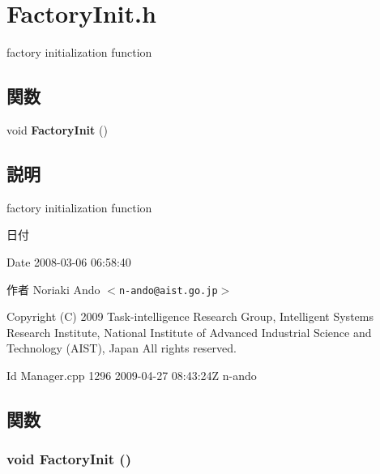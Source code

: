 \section{FactoryInit.h}
\label{FactoryInit_8h}


factory initialization function  


\subsection*{関数}
\begin{DoxyCompactItemize}
\item 
void {\bf FactoryInit} ()
\end{DoxyCompactItemize}


\subsection{説明}
factory initialization function \begin{DoxyDate}{日付}

\end{DoxyDate}
\begin{DoxyParagraph}{Date}
2008-\/03-\/06 06:58:40 
\end{DoxyParagraph}
\begin{DoxyAuthor}{作者}
Noriaki Ando $<${\tt n-\/ando@aist.go.jp}$>$
\end{DoxyAuthor}
Copyright (C) 2009 Task-\/intelligence Research Group, Intelligent Systems Research Institute, National Institute of Advanced Industrial Science and Technology (AIST), Japan All rights reserved.

\begin{DoxyParagraph}{Id}
Manager.cpp 1296 2009-\/04-\/27 08:43:24Z n-\/ando 
\end{DoxyParagraph}


\subsection{関数}
\subsubsection[{FactoryInit}]{\setlength{\rightskip}{0pt plus 5cm}void FactoryInit ()}\label{FactoryInit_8h_a0ca549944a211f60c882d30e06798e5c}
